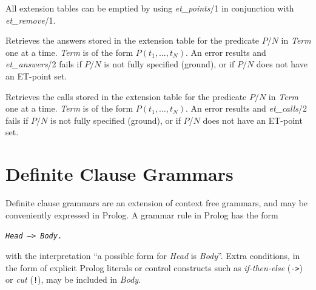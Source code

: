 \begin{description}
    All extension tables can be emptied by using {\em et\_\/points}/1
    in conjunction with {\em et\_\/remove}/1.

\item[{\bf et\_answers}($P/N$, {\em Term})]
    Retrieves the answers stored in the extension table for the predicate
    $P$/$N$ in {\em Term} one at a time.
    {\em Term} is of the form $P(t_1, \ldots, t_N)$.
    An error results and {\em et\_\/answers}/2 fails if $P/N$ is not fully
    specified (ground),
    or if $P/N$ does not have an ET-point set.

\item[{\bf et\_calls}({\em P/N}, {\em Term})]
    Retrieves the calls stored in the extension table for the predicate $P/N$
    in {\em Term} one at a time.
    {\em Term} is of the form $P(t_1, \ldots, t_N)$.
    An error results and {\em et\_\/calls}/2 fails if $P/N$ is not fully
    specified (ground),
    or if $P$/$N$ does not have an ET-point set.
\end{description}

\section{Definite Clause Grammars}

Definite clause grammars are an extension of context free grammars, and may
be conveniently expressed in Prolog.
A grammar rule in Prolog has the form
\begin{center}
{\tt {\em Head} --> {\em Body}.}
\end{center}
with the interpretation ``a possible form for {\em Head} is {\em Body}''.
Extra conditions, in the form of explicit Prolog literals or control
constructs such as {\em if-then-else} ({\tt->})
or {\em cut} ({\tt!}), may be included in {\em Body}.

